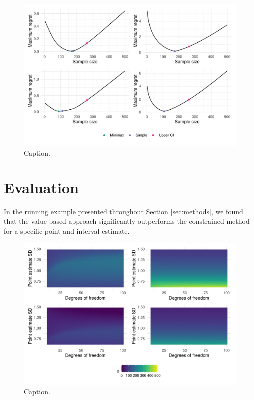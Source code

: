 \documentclass[sagev, Crown]{sagej}
\begin{document}
\begin{figure}
\centering
\includegraphics[scale=0.7]{./figures/p4}
\caption{Caption.}
\label{fig:p4}
\end{figure}

\section{Evaluation}\label{sec:evaluation}

In the running example presented throughout Section \ref{sec:methods}, we found that the value-based approach significantly outperforms the constrained method for a specific point and interval estimate.

\begin{figure}
\centering
\includegraphics[scale=0.7]{./figures/p3}
\caption{Caption.}
\label{fig:p3}
\end{figure}
\end{document}
